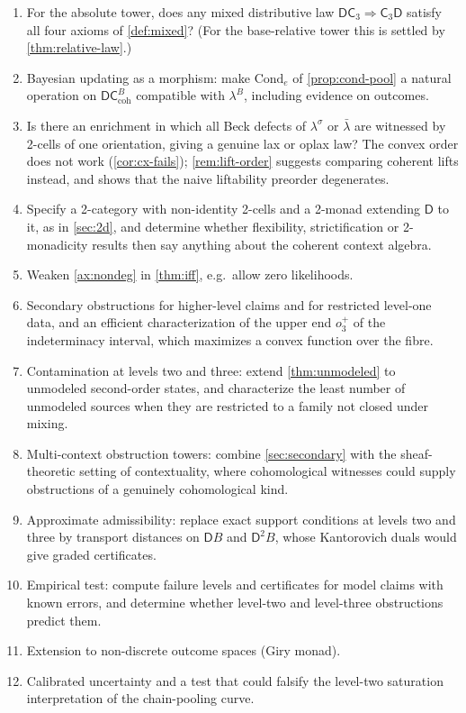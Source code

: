 \documentclass[11pt]{article}
\theoremstyle{definition}
\theoremstyle{remark}
\newcommand{\D}{\mathsf{D}}
\newcommand{\Cond}{\mathrm{Cond}}
\newcommand{\C}{\mathsf{C}}
\newcommand{\lb}{\bar\lambda}
\newcommand{\ls}{\lambda^{\sigma}}
\begin{document}
\begin{enumerate}[leftmargin=*]
\item For the absolute tower, does any mixed distributive law $\D\C_3\Rightarrow\C_3\D$ satisfy
  all four axioms of \cref{def:mixed}? (For the base-relative tower this is settled by
  \cref{thm:relative-law}.)
\item Bayesian updating as a morphism: make $\Cond_e$ of \cref{prop:cond-pool} a natural operation
  on $\D\C^B_{\mathrm{coh}}$ compatible with $\lambda^B$, including evidence on outcomes.
\item Is there an enrichment in which all Beck defects of $\ls$ or $\lb$ are witnessed by 2-cells of
  one orientation, giving a genuine lax or oplax law? The convex order does not work
  (\cref{cor:cx-fails}); \cref{rem:lift-order} suggests comparing coherent lifts instead, and shows
  that the naive liftability preorder degenerates.
\item Specify a 2-category with non-identity 2-cells and a 2-monad extending $\D$ to it, as in
  \cref{sec:2d}, and determine whether flexibility, strictification or 2-monadicity results then say
  anything about the coherent context algebra.
\item Weaken \cref{ax:nondeg} in \cref{thm:iff}, e.g.\ allow zero likelihoods.
\item Secondary obstructions for higher-level claims and for restricted level-one data, and an
  efficient characterization of the upper end $o_3^+$ of the indeterminacy interval, which maximizes a
  convex function over the fibre.
\item Contamination at levels two and three: extend \cref{thm:unmodeled} to unmodeled second-order
  states, and characterize the least number of unmodeled sources when they are restricted to a
  family not closed under mixing.
\item Multi-context obstruction towers: combine \cref{sec:secondary} with the sheaf-theoretic
  setting of contextuality, where cohomological witnesses \cite{AbramskyMansfieldBarbosa2012} could
  supply obstructions of a genuinely cohomological kind.
\item Approximate admissibility: replace exact support conditions at levels two and three by
  transport distances on $\D B$ and $\D^2B$, whose Kantorovich duals would give graded certificates.
\item Empirical test: compute failure levels and certificates for model claims with known errors, and
  determine whether level-two and level-three obstructions predict them.
\item Extension to non-discrete outcome spaces (Giry monad).
\item Calibrated uncertainty and a test that could falsify the level-two saturation interpretation of
  the chain-pooling curve.
\end{enumerate}
\end{document}
